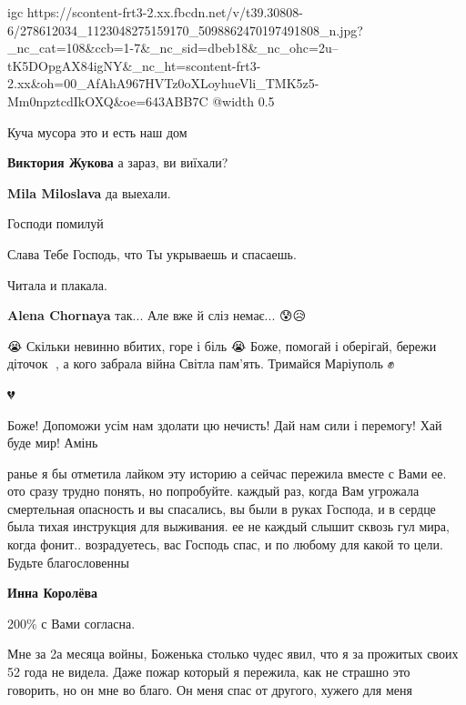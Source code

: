 
\ifcmt
  igc https://scontent-frt3-2.xx.fbcdn.net/v/t39.30808-6/278612034_1123048275159170_5098862470197491808_n.jpg?_nc_cat=108&ccb=1-7&_nc_sid=dbeb18&_nc_ohc=2u--tK5DOpgAX84igNY&_nc_ht=scontent-frt3-2.xx&oh=00_AfAhA967HVTz0oXLoyhueVli_TMK5z5-Mm0npztcdIkOXQ&oe=643ABB7C
	@width 0.5
\fi


Куча мусора это и есть наш дом

\begin{itemize} %
\textbf{Виктория Жукова} а зараз, ви виїхали?

\textbf{Mila Miloslava} да выехали. 🙏🙏🙏
\end{itemize} %



Господи помилуй


Слава Тебе Господь, что Ты укрываешь и спасаешь.


Читала и плакала.

\begin{itemize} %
\textbf{Alena Chornaya} так... Але вже й сліз немає... 😰😥
\end{itemize} %


😭 Скільки невинно вбитих, горе і біль 😭 Боже, помогай і оберігай, бережи
діточок 🙏, а кого забрала війна Світла пам'ять. Тримайся Маріуполь ✊🙏


💔


Боже! Допоможи усім нам здолати цю нечисть! Дай нам сили і перемогу! Хай буде
мир! Амінь 🙏🏻🙏🏻🙏🏻🇺🇦💙


ранье я бы отметила лайком эту историю а сейчас пережила вместе с Вами ее. ото
сразу трудно понять, но попробуйте. каждый раз, когда Вам угрожала смертельная
опасность и вы спасались, вы были в руках Господа, и в сердце была тихая
инструкция для выживания. ее не каждый слышит сквозь гул мира, когда
фонит.. возрадуетесь, вас Господь спас, и по любому для какой то цели. Будьте
благословенны

\begin{itemize} %
\textbf{Инна Королёва} 

200\% с Вами согласна.

Мне за 2а месяца войны, Боженька столько чудес явил, что я за прожитых своих 52
года не видела. Даже пожар который я пережила, как не страшно это говорить, но он
мне во благо. Он меня спас от другого, хужего для меня

\end{itemize} %

